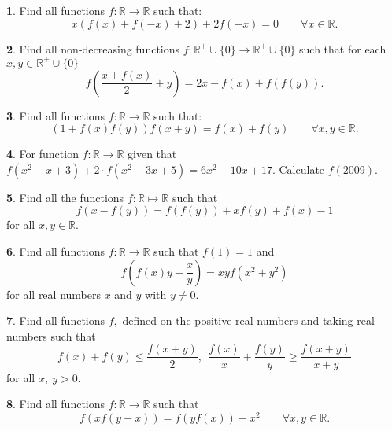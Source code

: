 \documentclass{article}
\newcommand{\plus}{+}
\newcommand{\minus}{-}
\newcommand{\equal}{=}
\theoremstyle{definition}
\newtheorem{p}{}
\begin{document}
\begin{p}
Find all functions $f:\mathbb{R}\rightarrow \mathbb{R}$ such that:
\[x(f(x)+f(-x)+2)+2f(-x)=0 \qquad \forall x\in \mathbb{R}.\]
\end{p}



\begin{p}
Find all non-decreasing functions $f:\mathbb R^+\cup\{0\}\rightarrow\mathbb R^+\cup\{0\}$ such that for each $x,y\in \mathbb R^+\cup\{0\}$
\[f\left(\frac{x+f(x)}2+y\right)=2x-f(x)+f(f(y)).\]
\end{p}



\begin{p}
Find all functions $f:\mathbb{R}\rightarrow \mathbb{R}$ such that:
\[(1+f(x)f(y))f(x+y)=f(x)+f(y) \qquad \forall x,y \in \mathbb R.\] 
\end{p}



\begin{p}
For function $ f: \mathbb{R} \to \mathbb{R}$ given that $ f(x^2 \plus{} x \plus{} 3) \plus{} 2 \cdot f(x^2 \minus{} 3x \plus{} 5) \equal{} 6x^2 \minus{} 10x \plus{} 17$. Calculate $ f(2009)$.
\end{p}



\begin{p}
Find all the functions $f: \mathbb{R} \mapsto \mathbb{R}$ such that
\[f(x-f(y))=f(f(y))+xf(y)+f(x)-1\]
for all $x,y \in \mathbb{R} $.
\end{p}





\begin{p}
Find all functions $f:\mathbb{R}\to\mathbb{R}$ such that $f(1)=1$ and
\[f\left(f(x)y+\frac{x}{y}\right)=xyf\left(x^2+y^2\right)\]
for all real numbers $x$ and $y$ with $y\neq0$.
\end{p}



\begin{p}
Find all functions $f,$ defined on the positive real numbers and taking real numbers such that 
\[f(x)+f(y)\leq \frac{f(x+y)}{2},\ \ \frac{f(x)}{x}+\frac{f(y)}{y}\geq \frac{f(x+y)}{x+y}\] for all $x,\ y>0.$
\end{p}



\begin{p}
Find all functions $ f: \mathbb R \to \mathbb R$ such that
\[f\left(xf(y-x)\right)=f\left(yf(x)\right)-x^2 \qquad \forall x,y \in \mathbb R.\]
\end{p}
\end{document}
